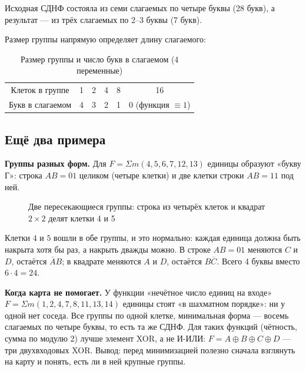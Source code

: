 Исходная СДНФ состояла из семи слагаемых по четыре буквы (28 букв), а
результат --- из трёх слагаемых по 2--3 буквы (7 букв).

Размер группы напрямую определяет длину слагаемого:

\begin{table}[H]
\centering
\caption{Размер группы и число букв в слагаемом (4 переменные)}
\begin{tabular}{c|ccccc}
\toprule
Клеток в группе & 1 & 2 & 4 & 8 & 16 \\
Букв в слагаемом & 4 & 3 & 2 & 1 & 0 (функция $\equiv 1$) \\
\bottomrule
\end{tabular}
\end{table}

\subsection{Ещё два примера}

\textbf{Группы разных форм.} Для $F=\Sigma m(4,5,6,7,12,13)$ единицы
образуют «букву Г»: строка $AB=01$ целиком (четыре клетки) и две клетки
строки $AB=11$ под ней.

\begin{figure}[H]
\centering
{}
\caption{Две пересекающиеся группы: строка из четырёх клеток и квадрат $2\times 2$ делят клетки 4 и 5}
\label{fig:karnaugh4_corner}
\end{figure}

Клетки $4$ и $5$ вошли в обе группы, и это нормально: каждая единица должна
быть накрыта хотя бы раз, а накрыть дважды можно. В строке $AB=01$ меняются
$C$ и $D$, остаётся $\overline{A}B$; в квадрате меняются $A$ и $D$, остаётся
$B\overline{C}$. Всего 4 буквы вместо $6\cdot4=24$.

\textbf{Когда карта не помогает.} У функции «нечётное число единиц на
входе» $F=\Sigma m(1,2,4,7,8,11,13,14)$ единицы стоят «в шахматном
порядке»: ни у одной нет соседа. Все группы по одной клетке, минимальная
форма --- восемь слагаемых по четыре буквы, то есть та же СДНФ. Для таких
функций (чётность, сумма по модулю 2) лучше элемент XOR, а не И-ИЛИ:
$F=A\oplus B\oplus C\oplus D$ --- три двухвходовых XOR. Вывод: перед
минимизацией полезно сначала взглянуть на карту и понять, есть ли в ней
крупные группы.

